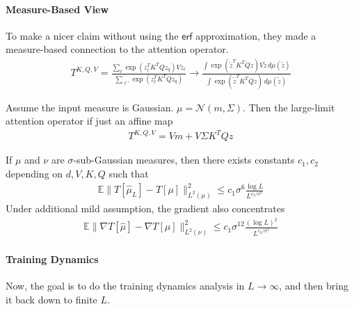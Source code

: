 \documentclass[11pt,fleqn]{article}
\numberwithin{equation}{section}
\theoremstyle{definition}
\theoremstyle{definition}
\begin{document}
\paragraph{Measure-Based View} To make a nicer claim without using the $\textsf{erf}$ approximation, they made a measure-based connection to the attention operator.
\begin{align}
	T^{K,Q,V} = \frac{\sum_{\ell} \exp(z^T_\ell K^T Q z_q) V z_\ell}{\sum_{\ell'} \exp(z_\ell^T K^T Q z_q)} \to \frac{\int \exp(\tilde z^T K^T Q z) V \tilde z \, d\mu(\tilde z)}{\int \exp(\tilde z^T K^T Q z) \, d\mu(\tilde z)}
\end{align}

\begin{fact}
	Assume the input measure is Gaussian. $\mu = \mathcal N(m, \Sigma)$. Then the large-limit attention operator if just an affine map
	\begin{align}
		T^{K,Q,V} = V m + V \Sigma K^T Q z
	\end{align}
\end{fact}

\begin{fact}
	If $\mu$ and $\nu$ are $\sigma$-sub-Gaussian measures, then there exists constants $c_1, c_2$ depending on $d,V,K,Q$ such that
	\begin{align}
		\mathbb E\|T[\hat \mu_L] - T[\mu]\|_{L^2(\mu)}^2 \leq c_1 \sigma^6 \frac{\log L}{L^{c_2 / \sigma^2}}
	\end{align}
	Under additional mild assumption, the gradient also concentrates
	\begin{align}
		\mathbb E\|\nabla T[\hat \mu] - \nabla T[\mu]\|_{L^2(\nu)}^2 \leq c_1 \sigma^{12} \frac{(\log L)^2}{L^{c_2 / \sigma^2}}
	\end{align}
\end{fact}

\paragraph{Training Dynamics}
Now, the goal is to do the training dynamics analysis in $L \to \infty$, and then bring it back down to finite $L$.





\newpage
\end{document}
